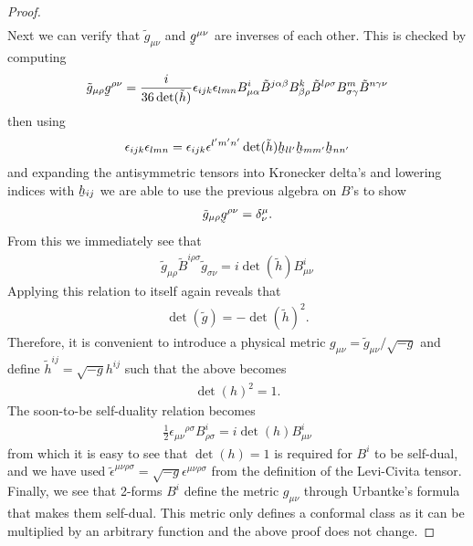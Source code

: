 \documentclass[10pt]{report}
\newcommand{\urb}[0]{Urbantke}
\newcommand{\utilde}[1]{\underaccent{\tilde}{#1}}
\theoremstyle{definition}
\newcommand{\teps}[0]{\tilde{\epsilon}}
\begin{document}
\begin{proof}
\begin{align}
    \end{align}
    Next we can verify that $\tilde{g}_{\mu\nu}$ and $\utilde{g}^{\mu\nu}$ are inverses of each other. This is checked by computing 
    \begin{align}
        \tilde{g}_{\mu\rho} \utilde{g}^{\rho\nu} = \frac{i}{36 \det(\tilde{h})} \epsilon_{ijk} \epsilon_{lmn} B^i_{\mu\alpha} \tilde{B}^{j\alpha\beta} B^k_{\beta\rho} \tilde{B}^{l\rho\sigma} B^m_{\sigma\gamma} \tilde{B}^{n\gamma\nu}
    \end{align}
    then using 
    \begin{align}
        \epsilon_{ijk} \epsilon_{lmn} = \epsilon_{ijk} \epsilon^{l'm'n'} \det(\tilde{h}) \utilde{h}_{ll'} \utilde{h}_{mm'} \utilde{h}_{nn'}
    \end{align}
    and expanding the antisymmetric tensors into Kronecker delta's and lowering indices with $\utilde{h}_{ij}$ we are able to use the previous algebra on $B$'s to show 
    \begin{align}
        \tilde{g}_{\mu\rho} \utilde{g}^{\rho\nu} = \delta^\mu_\nu. \label{eq:pleb-metric-times-inverse-det-h}
    \end{align}
    From this we immediately see that  
    \begin{align}
        \tilde{g}_{\mu\rho} \tilde{B}^{i\rho\sigma} \tilde{g}_{\sigma\nu} = i \det(\tilde{h}) B^i_{\mu\nu}
    \end{align}
    Applying this relation to itself again reveals that 
    \begin{align}
        \det(\tilde{g}) = -\det(\tilde{h})^2.
    \end{align}
    Therefore, it is convenient to introduce a physical metric \(g_{\mu\nu} = \tilde{g}_{\mu\nu}/\sqrt{-g}\) and define $\tilde{h}^{ij} = \sqrt{-g} h^{ij}$ such that the above becomes 
    \begin{align}
        \det(h)^2 = 1.
    \end{align}
    The soon-to-be self-duality relation becomes 
    \begin{align}
        \frac{1}{2} \epsilon_{\mu\nu}{}^{\rho\sigma} B^i_{\rho\sigma} = i \det(h) B^i_{\mu\nu}
    \end{align}
    from which it is easy to see that $\det(h) = 1$ is required for $B^i$ to be self-dual, and we have used $\teps^{\mu\nu\rho\sigma} = \sqrt{-g} \epsilon^{\mu\nu\rho\sigma}$ from the definition of the Levi-Civita tensor. Finally, we see that 2-forms $B^i$ define the metric $g_{\mu\nu}$ through \urb{}'s formula that makes them self-dual. This metric only defines a conformal class as it can be multiplied by an arbitrary function and the above proof does not change.
\end{proof}
\end{document}

